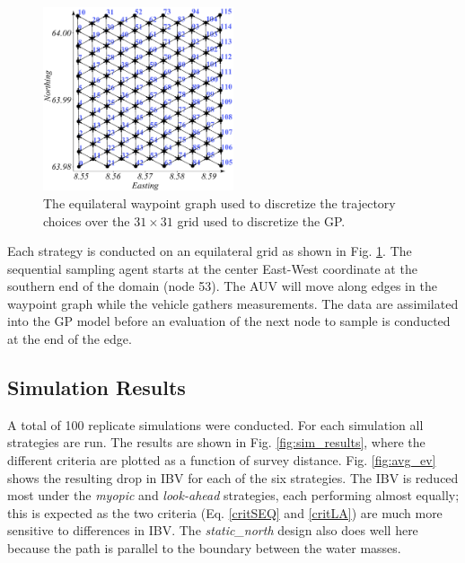 \documentclass[aoas]{imsart}
\begin{document}
\begin{figure}[h!]
\centering
\includegraphics[width=0.50\textwidth]{Figures/sim/wp_graph_paper.pdf}
\caption{The equilateral waypoint graph used to discretize the
  trajectory choices over the $31\times31$ grid used to discretize the GP.}
\label{fig:wp_graph}
\end{figure}

Each strategy is conducted on an equilateral grid as shown in Fig. \ref{fig:wp_graph}. The sequential sampling agent starts at the center East-West coordinate at the southern end of the domain (node 53). The AUV will move along edges in the waypoint graph while the vehicle gathers measurements. The data are assimilated into the GP model before an evaluation of the next node to sample is conducted at the end of the edge.

\subsection{Simulation Results}
A total of 100 replicate simulations were conducted. For each simulation all strategies are run. The results are shown in Fig. \ref{fig:sim_results},
where the different criteria are plotted as a function of survey distance. Fig. \ref{fig:avg_ev} shows the resulting drop in IBV for each of the six strategies. The IBV is reduced most under the \textit{myopic} and \textit{look-ahead} strategies, each performing almost equally; this is expected as the two criteria (Eq. \eqref{critSEQ} and \eqref{critLA}) are much more sensitive to differences in IBV. The \textit{static\_north} design also does well here because the path is parallel to the  boundary between the water masses.
\end{document}
